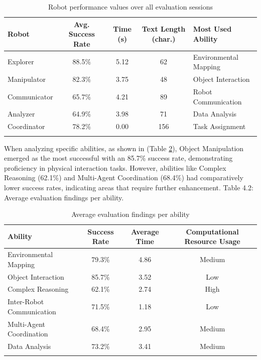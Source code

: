 \documentclass[pdflatex,sn-mathphys-num]{sn-jnl}
\theoremstyle{thmstyleone}
\theoremstyle{thmstyletwo}%
\theoremstyle{thmstylethree}%
\begin{document}
\begin{table}[h]
\caption{Robot performance values over all evaluation sessions}\label{robot-performance}
\begin{tabular*}{\textwidth}{@{\extracolsep\fill}lcccl}
\toprule
Robot & Avg. Success Rate & Time (s) & Text Length (char.) & Most Used Ability \\
\midrule
Explorer & 88.5\% & 5.12 & 62 & Environmental Mapping \\
Manipulator & 82.3\% & 3.75 & 48 & Object Interaction \\
Communicator & 65.7\% & 4.21 & 89 & Robot Communication \\
Analyzer & 64.9\% & 3.98 & 71 & Data Analysis \\
Coordinator & 78.2\% & 0.00 & 156 & Task Assignment \\
\botrule
\end{tabular*}
\end{table}

When analyzing specific abilities, as shown in (Table \ref{ability-rating}), Object Manipulation emerged as the most successful with an 85.7\% success rate, demonstrating proficiency in physical interaction tasks. However, abilities like Complex Reasoning (62.1\%) and Multi-Agent Coordination (68.4\%) had comparatively lower success rates, indicating areas that require further enhancement.
Table 4.2: Average evaluation findings per ability.
\begin{table}[h]
\caption{Average evaluation findings per ability}\label{ability-rating}
\begin{tabular*}{\textwidth}{@{\extracolsep\fill}lccc}
\toprule
Ability & Success Rate & Average Time & Computational Resource Usage \\
\midrule
Environmental Mapping & 79.3\% & 4.86 & Medium \\
Object Interaction & 85.7\% & 3.52 & Low \\
Complex Reasoning & 62.1\% & 2.74 & High \\
Inter-Robot Communication & 71.5\% & 1.18 & Low \\
Multi-Agent Coordination & 68.4\% & 2.95 & Medium \\
Data Analysis & 73.2\% & 3.41 & Medium \\
\botrule
\end{tabular*}
\end{table}
\end{document}
